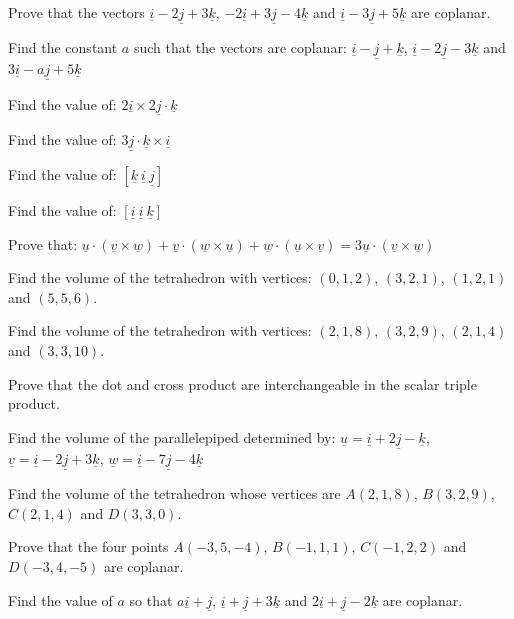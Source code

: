 \documentclass[11pt,a4paper]{article}
\begin{document}
\begin{shortlist}
\item Prove that the vectors $\underline{i}-2\underline{j}+3\underline{k}$, $-2\underline{i}+3\underline{j}-4\underline{k}$ and $\underline{i}-3\underline{j}+5\underline{k}$ are coplanar.

\item Find the constant $a$ such that the vectors are coplanar: $\underline{i}-\underline{j}+\underline{k}$, $\underline{i}-2\underline{j}-3\underline{k}$ and $3\underline{i}-a\underline{j}+5\underline{k}$

\item Find the value of: $2\underline{i}\times2\underline{j}\cdot\underline{k}$

\item Find the value of: $3\underline{j}\cdot\underline{k}\times\underline{i}$

\item Find the value of: $[\underline{k}\ \underline{i}\ \underline{j}]$

\item Find the value of: $[\underline{i}\ \underline{i}\ \underline{k}]$

\item Prove that: $\underline{u}\cdot(\underline{v}\times\underline{w})+\underline{v}\cdot(\underline{w}\times\underline{u})+\underline{w}\cdot(\underline{u}\times\underline{v})=3\underline{u}\cdot(\underline{v}\times\underline{w})$

\item Find the volume of the tetrahedron with vertices: $(0,1,2)$, $(3,2,1)$, $(1,2,1)$ and $(5,5,6)$.

\item Find the volume of the tetrahedron with vertices: $(2,1,8)$, $(3,2,9)$, $(2,1,4)$ and $(3,3,10)$.

\item Prove that the dot and cross product are interchangeable in the scalar triple product.

\item Find the volume of the parallelepiped determined by: $\underline{u}=\underline{i}+2\underline{j}-\underline{k}$, $\underline{v}=\underline{i}-2\underline{j}+3\underline{k}$, $\underline{w}=\underline{i}-7\underline{j}-4\underline{k}$

\item Find the volume of the tetrahedron whose vertices are $A(2,1,8)$, $B(3,2,9)$, $C(2,1,4)$ and $D(3,3,0)$.

\item Prove that the four points $A(-3,5,-4)$, $B(-1,1,1)$, $C(-1,2,2)$ and $D(-3,4,-5)$ are coplanar.

\item Find the value of $a$ so that $a\underline{i}+\underline{j}$, $\underline{i}+\underline{j}+3\underline{k}$ and $2\underline{i}+\underline{j}-2\underline{k}$ are coplanar.

\end{shortlist}
\end{document}
